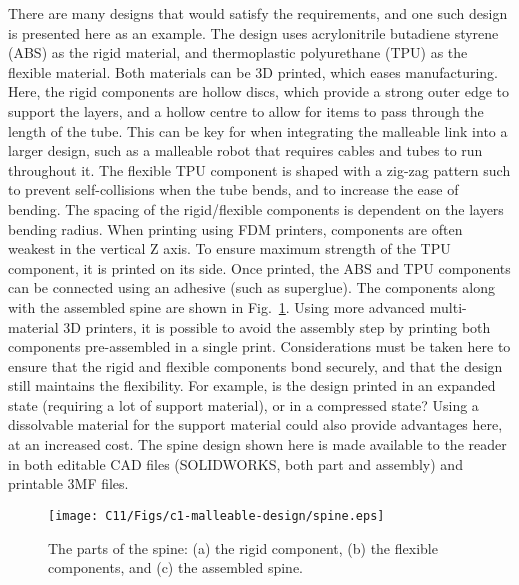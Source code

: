 There are many designs that would satisfy the requirements, and one such design is presented here as an example. The design uses acrylonitrile butadiene styrene (ABS) as the rigid material, and thermoplastic polyurethane (TPU) as the flexible material. Both materials can be 3D printed, which eases manufacturing. Here, the rigid components are hollow discs, which provide a strong outer edge to support the layers, and a hollow centre to allow for items to pass through the length of the tube. This can be key for when integrating the malleable link into a larger design, such as a malleable robot that requires cables and tubes to run throughout it. The flexible TPU component is shaped with a zig-zag pattern such to prevent self-collisions when the tube bends, and to increase the ease of bending. The spacing of the rigid/flexible components is dependent on the layers bending radius. When printing using FDM printers, components are often weakest in the vertical Z axis. To ensure maximum strength of the TPU component, it is printed on its side. Once printed, the ABS and TPU components can be connected using an adhesive (such as superglue). The components along with the assembled spine are shown in Fig.~\ref{spine}. Using more advanced multi-material 3D printers, it is possible to avoid the assembly step by printing both components pre-assembled in a single print. Considerations must be taken here to ensure that the rigid and flexible components bond securely, and that the design still maintains the flexibility. For example, is the design printed in an expanded state (requiring a lot of support material), or in a compressed state? Using a dissolvable material for the support material could also provide advantages here, at an increased cost. The spine design shown here is made available to the reader in both editable CAD files (SOLIDWORKS, both part and assembly) and printable 3MF files. 

\begin{figure}[t!]
    \centering
    \texttt{[image: C11/Figs/c1-malleable-design/spine.eps]}
    \caption{The parts of the spine: (a) the rigid component, (b) the flexible components, and (c) the assembled spine.}
    \label{spine}
\end{figure}


